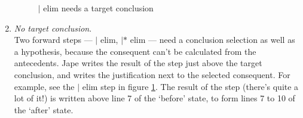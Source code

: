 \documentclass[11pt]{book}
\newcommand{\figref}[1]{figure \ref{fig:#1}}
\begin{document}
\begin{enumerate}
\begin{figure}
{  \parbox[b]{200pt}{\centering{}}}
\caption{$|$ elim needs a target conclusion}
\label{fig:velimneedstargetconclusion}
\end{figure}

\item \emph{No target conclusion}.\\
Two forward steps --- $|$ elim, $|*$ elim --- need a conclusion selection as well as a hypothesis, because the consequent can't be calculated from the antecedents. Jape writes the result of the step just above the target conclusion, and writes the justification next to the selected consequent. For example, see the $|$ elim step 
in \figref{velimneedstargetconclusion}. The result of the step (there's quite a lot of it!) is written above line 7 of the `before' state, to form lines 7 to 10 of the `after' state.


\end{enumerate}
\end{document}

